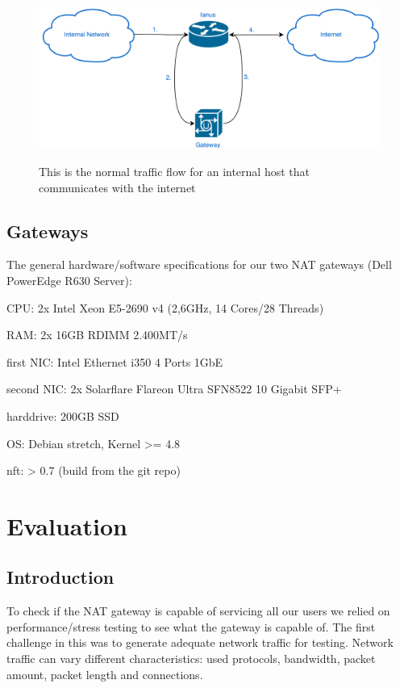 \documentclass{report}
\begin{document}
\begin{figure}[ht]
	\centering
	\includegraphics[width=\textwidth]{../NetworkFlow.pdf}
	\label{NetworkFlow.pdf}
	\caption{This is the normal traffic flow for an internal host that communicates with the internet}  
\end{figure}


\section{Gateways}\label{gateways}

The general hardware/software specifications for our two NAT gateways (Dell PowerEdge R630 Server): \\
\begin{description}
\item CPU: 2x Intel Xeon E5-2690 v4 (2,6GHz, 14 Cores/28 Threads)
\item RAM: 2x 16GB RDIMM 2.400MT/s 
\item first NIC: Intel Ethernet i350 4 Ports 1GbE
\item second NIC: 2x Solarflare Flareon Ultra SFN8522 10 Gigabit SFP+
\item harddrive: 200GB SSD
\item OS: Debian stretch, Kernel \textgreater{}= 4.8
\item nft: \textgreater{} 0.7 (build from the git repo)
\end{description}

\chapter{Evaluation}\label{evaluation}

\section{Introduction}\label{introduction-1}

To check if the NAT gateway is capable of servicing all our users we
relied on performance/stress testing to see what the gateway is capable
of. The first challenge in this was to generate adequate network traffic
for testing. Network traffic can vary different characteristics: used
protocols, bandwidth, packet amount, packet length and connections.
\end{document}
